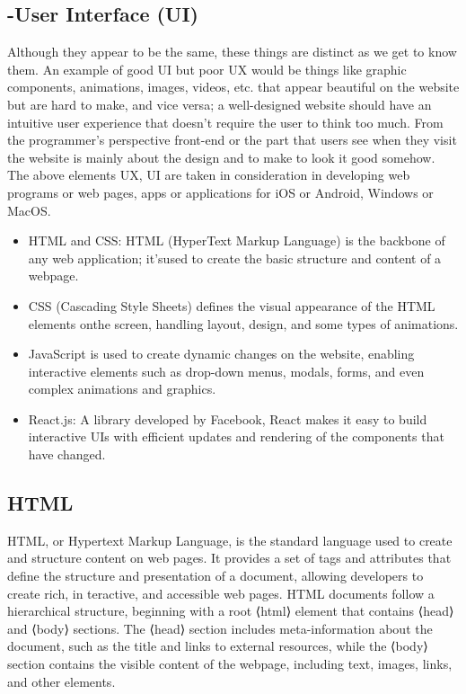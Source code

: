 \subsection*{-User Interface (UI)}
Although they appear to be the same, these things are distinct as we get to know them. An example of good UI but poor UX would be things like graphic components, animations, images, videos, etc. that appear beautiful on the website but are hard to make, and vice versa; a well-designed website should have an intuitive user experience that doesn't require the user to think too much.
From the programmer’s perspective front-end or the part that users see when they visit the website is mainly about the design and to make to look it good somehow. The above elements UX, UI are taken in consideration in developing web programs or web pages, apps or applications for iOS or Android, Windows or MacOS.\bigskip
\begin{itemize}
\item  HTML and CSS: HTML (HyperText Markup Language) is the backbone of any web application; it’sused to create the basic structure and content of a webpage.
\end{itemize}
\begin{itemize}
\item CSS (Cascading Style Sheets) defines the visual appearance of the HTML elements onthe screen, handling layout, design, and some types of animations.
\end{itemize}
\begin{itemize}
\item JavaScript is used to create dynamic changes on the website, enabling interactive elements such as drop-down menus, modals, forms, and even complex animations and graphics.
\end{itemize}
\begin{itemize}
\item React.js: A library developed by Facebook, React makes it easy to build interactive UIs with efficient updates and rendering of the components that have changed.
\end{itemize}
\subsection{HTML} HTML, or Hypertext Markup Language, is the standard language used to create and
structure content on web pages. It provides a set of tags and attributes that define
the structure and presentation of a document, allowing developers to create rich, in
teractive, and accessible web pages. HTML documents follow a hierarchical structure,
beginning with a root ⟨html⟩ element that contains ⟨head⟩ and ⟨body⟩ sections. The
⟨head⟩ section includes meta-information about the document, such as the title and
links to external resources, while the ⟨body⟩ section contains the visible content of the
webpage, including text, images, links, and other elements.
